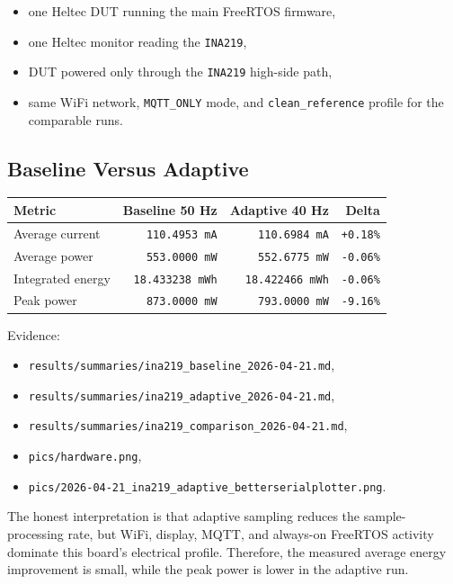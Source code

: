 \documentclass[12pt,a4paper]{article}
\begin{document}
\begin{itemize}
    \item one Heltec DUT running the main FreeRTOS firmware,
    \item one Heltec monitor reading the \texttt{INA219},
    \item DUT powered only through the \texttt{INA219} high-side path,
    \item same WiFi network, \texttt{MQTT\_ONLY} mode, and
    \texttt{clean\_reference} profile for the comparable runs.
\end{itemize}

\subsection*{Baseline Versus Adaptive}

\begin{center}
\begin{tabular}{|l|r|r|r|}
\hline
\textbf{Metric} & \textbf{Baseline 50 Hz} & \textbf{Adaptive 40 Hz} & \textbf{Delta} \\
\hline
Average current & \texttt{110.4953 mA} & \texttt{110.6984 mA} & \texttt{+0.18\%} \\
\hline
Average power & \texttt{553.0000 mW} & \texttt{552.6775 mW} & \texttt{-0.06\%} \\
\hline
Integrated energy & \texttt{18.433238 mWh} & \texttt{18.422466 mWh} & \texttt{-0.06\%} \\
\hline
Peak power & \texttt{873.0000 mW} & \texttt{793.0000 mW} & \texttt{-9.16\%} \\
\hline
\end{tabular}
\end{center}

Evidence:

\begin{itemize}
    \item \texttt{results/summaries/ina219\_baseline\_2026-04-21.md},
    \item \texttt{results/summaries/ina219\_adaptive\_2026-04-21.md},
    \item \texttt{results/summaries/ina219\_comparison\_2026-04-21.md},
    \item \texttt{pics/hardware.png},
    \item \texttt{pics/2026-04-21\_ina219\_adaptive\_betterserialplotter.png}.
\end{itemize}

The honest interpretation is that adaptive sampling reduces the
sample-processing rate, but WiFi, display, MQTT, and always-on FreeRTOS
activity dominate this board's electrical profile. Therefore, the measured
average energy improvement is small, while the peak power is lower in the
adaptive run.
\end{document}
